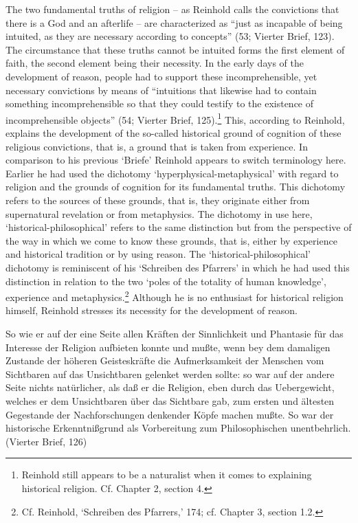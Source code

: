 The two fundamental truths of religion {--} as Reinhold calls the convictions that there is a God and an afterlife {--} are characterized as ``just as incapable of being intuited, as they are necessary according to concepts'' (53; Vierter Brief, 123). The circumstance that these truths cannot be intuited forms the first element of faith, the second element being their necessity. In the early days of the development of reason, people had to support these incomprehensible, yet necessary convictions by means of ``intuitions that likewise had to contain something incomprehensible so that they could testify to the existence of incomprehensible objects'' (54; Vierter Brief, 125).\footnote{ Reinhold still appears to be a naturalist when it comes to explaining historical religion. Cf. Chapter 2, section 4.} This, according to Reinhold, explains the development of the so{-}called historical ground of cognition of these religious convictions, that is, a ground that is taken from experience. In comparison to his previous `Briefe' Reinhold appears to switch terminology here. Earlier he had used the dichotomy `hyperphysical{-}metaphysical' with regard to religion and the grounds of cognition for its fundamental truths. This dichotomy refers to the sources of these grounds, that is, they originate either from supernatural revelation or from metaphysics. The dichotomy in use here, `historical{-}philosophical' refers to the same distinction but from the perspective of the way in which we come to know these grounds, that is, either by experience and historical tradition or by using reason. The `historical{-}philosophical' dichotomy is reminiscent of his `Schreiben des Pfarrers' in which he had used this distinction in relation to the two `poles of the totality of human knowledge', experience and metaphysics.\footnote{ Cf. Reinhold, `Schreiben des Pfarrers,' 174; cf. Chapter 3, section 1.2.} Although he is no enthusiast for historical religion himself, Reinhold stresses its necessity for the development of reason. 

So wie er auf der eine Seite allen Kr\"{a}ften der Sinnlichkeit und Phantasie f\"{u}r das Interesse der Religion aufbieten konnte und mu\ss{}te, wenn bey dem damaligen Zustande der h\"{o}heren Geisteskr\"{a}fte die Aufmerksamkeit der Menschen vom Sichtbaren auf das Unsichtbaren gelenket werden sollte: so war auf der andere Seite nichts nat\"{u}rlicher, als da\ss{} er die Religion, eben durch das Uebergewicht, welches er dem Unsichtbaren \"{u}ber das Sichtbare gab, zum ersten und \"{a}ltesten Gegestande der Nachforschungen denkender K\"{o}pfe machen mu\ss{}te. So war der historische Erkenntni\ss{}grund als Vorbereitung zum Philosophischen unentbehrlich. (Vierter Brief, 126)

